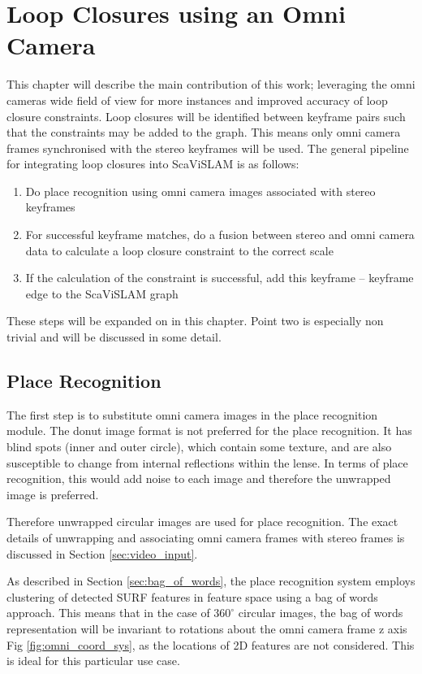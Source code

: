 \chapter{Loop Closures using an Omni Camera}
\label{chapter:omni_loop_close}

This chapter will describe the main contribution of this work; leveraging the omni cameras wide field of view for more instances and improved accuracy of loop closure constraints.  Loop closures will be identified between keyframe pairs such that the constraints may be added to the graph.  This means only omni camera frames synchronised with the stereo keyframes will be used.
The general pipeline for integrating loop closures into ScaViSLAM is as follows: 
\begin{enumerate} \itemsep1pt  \parskip0pt 
 \item Do place recognition using omni camera images associated with stereo keyframes
 \item For successful keyframe matches, do a fusion between stereo and omni camera data to calculate a loop closure constraint to the correct scale
 \item If the calculation of the constraint is successful, add this keyframe -- keyframe edge to the ScaViSLAM graph
\end{enumerate}
These steps will be expanded on in this chapter.  Point two is especially non trivial and will be discussed in some detail. 

\section{Place Recognition}

The first step is to substitute omni camera images in the place recognition module. The donut image format is not preferred for the place recognition.  It has blind spots (inner and outer circle), which contain some texture, and are also susceptible to change from internal reflections within the lense.  In terms of place recognition, this would add noise to each image and therefore the unwrapped image is preferred.

Therefore unwrapped circular images are used for place recognition.  The exact details of unwrapping and associating omni camera frames with stereo frames is discussed in Section \ref{sec:video_input}.

As described in Section \ref{sec:bag_of_words}, the place recognition system employs clustering of detected SURF features in feature space using a bag of words approach.  This means that in the case of $360^\circ$ circular images, the bag of words representation will be invariant to rotations about the omni camera frame z axis Fig \ref{fig:omni_coord_sys}, as the locations of 2D features are not considered.  This is ideal for this particular use case.

